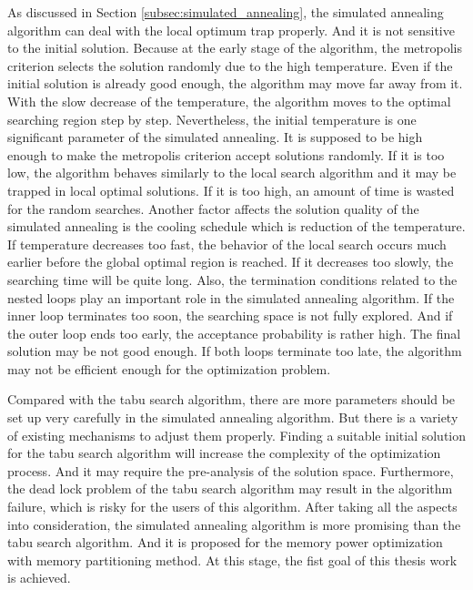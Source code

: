 	As discussed in Section \ref{subsec:simulated_annealing}, the simulated
	annealing algorithm can deal with the local optimum trap properly.
	And it is not sensitive to the initial solution. Because at the early
	stage of the algorithm, the metropolis criterion selects the solution
	randomly due to the high temperature. Even if the initial solution is
	already good enough, the algorithm may move far away from it. With the
	slow decrease of the temperature, the algorithm moves to the optimal
	searching region step by step.
	Nevertheless, the initial temperature is one significant parameter of the
	simulated annealing. It is supposed to be high enough to make the metropolis
	criterion accept solutions randomly. If it is too low, the algorithm
	behaves similarly to the local search algorithm and it may be trapped
	in local optimal solutions.
	If it is too high, an amount of time is wasted for the random searches.
	Another factor affects the solution quality of the simulated annealing is the
	cooling schedule which is reduction of the temperature.
	If temperature decreases too fast, the behavior of the local
	search occurs much earlier before the global optimal region is reached.
	If it decreases too slowly, the searching time will be quite long.
	Also, the termination conditions related to the nested loops play an important
	role in the simulated annealing algorithm. If the inner loop terminates too
	soon, the searching space is not fully explored. And if the outer loop ends too
	early, the acceptance probability is rather high. The final solution may be not
	good enough. If both loops terminate too late, the algorithm may not be efficient
	enough for the optimization problem.
	
	Compared with the tabu search algorithm, there are more parameters should be set up
	very carefully in the simulated annealing algorithm. But there is a variety of existing
	mechanisms to adjust them properly. Finding a suitable initial solution for the
	tabu search algorithm will increase the complexity of the optimization process.
	And it may require the pre-analysis of the solution space. Furthermore, the
	dead lock problem of the tabu search algorithm may result in the algorithm failure,
	which is risky for the users of this algorithm. After taking all the
	aspects into consideration, the simulated annealing algorithm is more
	promising than the tabu search algorithm. And it is proposed for the memory
	power optimization with memory partitioning method.
	At this stage, the fist goal of this thesis work is achieved.
	
